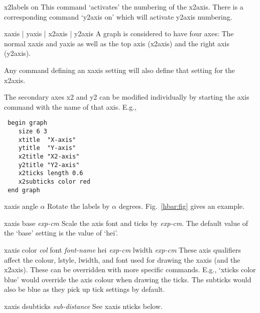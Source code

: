 \begin{commanddescription}
\item[{\sf x2labels on}]
This command `activates' the numbering of the x2axis.  There is a
corresponding command `{\sf y2axis on}' which will activate y2axis numbering.

\item[{\sf xaxis | yaxis | x2axis | y2axis}]
A graph is considered to have four axes:  The normal xaxis and
yaxis as well as the top axis (x2axis) and the right axis (y2axis).

Any command defining an xaxis setting will also define that setting
for the x2axis.

The secondary axes x2 and y2 can be modified individually by starting the
axis command with the name of that axis. E.g.,

\begin{minipage}[c]{8cm}
\begin{Verbatim}
 begin graph
    size 6 3 
    xtitle  "X-axis"
    ytitle  "Y-axis"
    x2title "X2-axis"
    y2title "Y2-axis"
    x2ticks length 0.6
    x2subticks color red
 end graph
\end{Verbatim}
\end{minipage}
\hfill
\begin{minipage}[c]{7cm}
\mbox{}
\end{minipage}

\item[{\sf xaxis angle $\alpha$}]
Rotate the labels by $\alpha$ degrees. Fig.~\ref{hbar:fig} gives an example.

\item[{\sf xaxis base {\it exp-cm}} ]
Scale the axis font and ticks by {\it exp-cm}. The default value of the `{\sf base}' setting is the value of `{\sf hei}'.

\item[{\sf xaxis color {\it col} font {\it font-name}  hei {\it exp-cm} lwidth {\it exp-cm}} ]
These axis qualifiers affect the colour, lstyle, lwidth, and font used for drawing the xaxis (and the x2axis).  These can be overridden with more specific commands. E.g., `{\sf xticks color blue}' would override the axis colour when drawing the ticks. The subticks would also be blue as they pick up tick settings by default.

\item[{\sf xaxis dsubticks {\it sub-distance} }  ]
See {\sf xaxis nticks} below.


\end{commanddescription}

